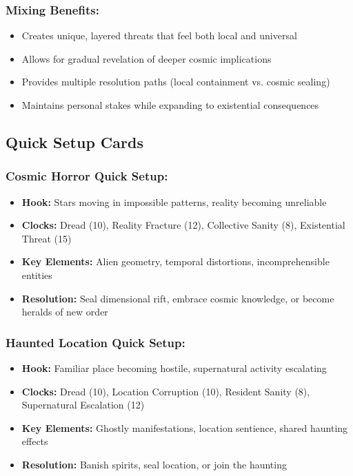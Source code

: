 \documentclass[11pt]{article}
\begin{document}
\subsubsection{Mixing Benefits:}
\begin{itemize}
\item Creates unique, layered threats that feel both local and universal
\item Allows for gradual revelation of deeper cosmic implications
\item Provides multiple resolution paths (local containment vs. cosmic sealing)
\item Maintains personal stakes while expanding to existential consequences
\end{itemize}

\subsection{Quick Setup Cards}

\subsubsection{Cosmic Horror Quick Setup:}
\begin{itemize}
\item \textbf{Hook:} Stars moving in impossible patterns, reality becoming unreliable
\item \textbf{Clocks:} Dread (10), Reality Fracture (12), Collective Sanity (8), Existential Threat (15)
\item \textbf{Key Elements:} Alien geometry, temporal distortions, incomprehensible entities
\item \textbf{Resolution:} Seal dimensional rift, embrace cosmic knowledge, or become heralds of new order
\end{itemize}

\subsubsection{Haunted Location Quick Setup:}
\begin{itemize}
\item \textbf{Hook:} Familiar place becoming hostile, supernatural activity escalating
\item \textbf{Clocks:} Dread (10), Location Corruption (10), Resident Sanity (8), Supernatural Escalation (12)
\item \textbf{Key Elements:} Ghostly manifestations, location sentience, shared haunting effects
\item \textbf{Resolution:} Banish spirits, seal location, or join the haunting
\end{itemize}
\end{document}
